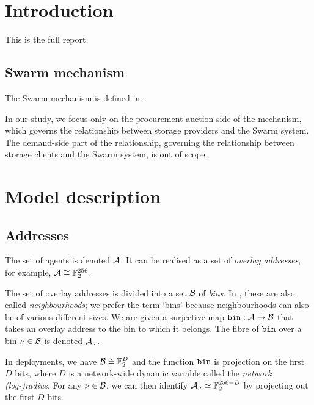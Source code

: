 \maketitle
\section{Introduction}

This is the full report.


\subsection{Swarm mechanism}

The Swarm mechanism is defined in \cite{book-of-swarm}.

In our study, we focus only on the procurement auction side of the mechanism, which governs the relationship between storage providers and the Swarm system.
%
The demand-side part of the relationship, governing the relationship between storage clients and the Swarm system, is out of scope.

\section{Model description}

\subsection{Addresses}

The set of agents is denoted $\mathcal{A}$.
%
It can be realised as a set of \emph{overlay addresses}, for example, $\mathcal{A} \cong \mathbb{F}_2^{256}$.

The set of overlay addresses is divided into a set $\mathcal{B}$ of \emph{bins}.
%
In \cite{book-of-swarm}, these are also called \emph{neighbourhoods}; we prefer the term `bins' because neighbourhoods can also be of various different sizes.
%
We are given a surjective map $\mathtt{bin}:\mathcal{A}\rightarrow\mathcal{B}$ that takes an overlay address to the bin to which it belongs.
%
The fibre of $\mathtt{bin}$ over a bin $\nu\in\mathcal{B}$ is denoted $\mathcal{A}_\nu$.

In deployments, we have $\mathcal{B}\cong \mathbb{F}_2^D$ and the function $\mathtt{bin}$ is projection on the first $D$ bits, where $D$ is a network-wide dynamic variable called the \emph{network (log-)radius}.
%
For any $\nu\in\mathcal{B}$, we can then identify $\mathcal{A}_\nu\simeq\mathbb{F}_2^{256-D}$ by projecting out the first $D$ bits.


